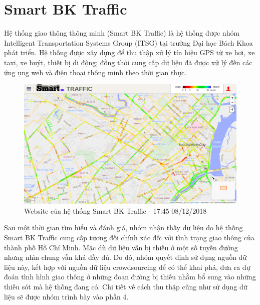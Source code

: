 \section{Smart BK Traffic}
Hệ thống giao thông thông minh (Smart BK Traffic) là hệ thống được nhóm Intelligent Transportation Systems Group (ITSG) tại trường Đại học Bách Khoa phát triển. Hệ thống được xây dựng để thu thập xử lý tín hiệu GPS từ xe hơi, xe taxi, xe buýt, thiết bị di động; đồng thời cung cấp dữ liệu đã được xử lý đến các ứng ụng web và điện thoại thông minh theo thời gian thực.

\begin{figure}[!ht]
	\begin{center}
		\includegraphics[width=1.0\textwidth]{images/smartbktraffic.png}
	\end{center}
	\caption{Website của hệ thống Smart BK Traffic - 17:45 08/12/2018}
\end{figure}

Sau một thời gian tìm hiểu và đánh giá, nhóm nhận thấy dữ liệu do hệ thống Smart BK Traffic cung cấp tương đối chính xác đối với tình trạng giao thông của thành phố Hồ Chí Minh. Mặc dù dữ liệu vẫn bị thiếu ở một số tuyến đường nhưng nhìn chung vẫn khá đầy đủ. Do đó, nhóm quyết định sử dụng nguồn dữ liệu này, kết hợp với nguồn dữ liệu crowdsourcing để có thể khai phá, đưa ra dự đoán tình hình giao thông ở những đoạn đường bị thiếu nhằm bổ sung vào những thiếu sót mà hệ thống đang có. Chi tiết về cách thu thập cũng như sử dụng dữ liệu sẽ được nhóm trình bày vào phần 4.
